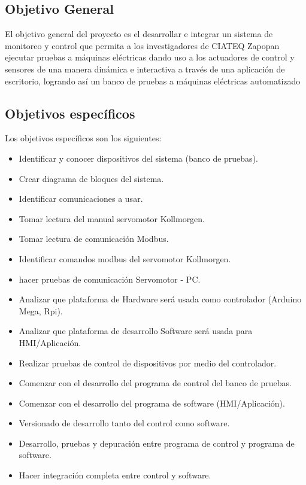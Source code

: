\documentclass[12pt,titlepage]{article}
\begin{document}
\subsection{Objetivo General}
El objetivo general del proyecto es el desarrollar e integrar un sistema de monitoreo y control que permita a los investigadores de CIATEQ Zapopan ejecutar pruebas a máquinas eléctricas dando uso a los actuadores de control y sensores de una manera dinámica e interactiva a través de una aplicación de escritorio, logrando así un banco de pruebas a máquinas eléctricas automatizado \\[0.8mm]

\subsection{Objetivos específicos}
Los objetivos específicos son los siguientes: \\[0.8mm]

\begin{itemize}
\item Identificar y conocer dispositivos del sistema (banco de pruebas).
\item Crear diagrama de bloques del sistema.
\item Identificar comunicaciones a usar. 
\item Tomar lectura del manual servomotor Kollmorgen.
\item Tomar lectura de comunicación Modbus.
\item Identificar comandos modbus del servomotor Kollmorgen.
\item hacer pruebas de comunicación Servomotor - PC.
\item Analizar que plataforma de Hardware será usada como controlador (Arduino Mega, Rpi).
\item Analizar que plataforma de desarrollo Software  será usada para HMI/Aplicación.
\item Realizar pruebas de control de dispositivos por medio del controlador. 
\item Comenzar con el desarrollo del programa de control del banco de pruebas.
\item Comenzar con el desarrollo del programa de software (HMI/Aplicación).
\item Versionado de desarrollo tanto del control como software.  
\item Desarrollo, pruebas y depuración entre programa de control y programa de software.
\item Hacer integración completa entre control y software. 
\end{itemize}
\newpage
\end{document}
